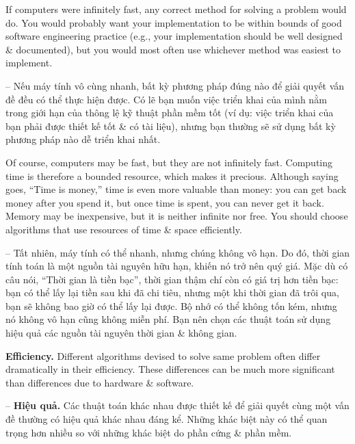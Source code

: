 \documentclass{article}
\begin{document}
\begin{itemize}
\begin{itemize}
\begin{itemize}
            If computers were infinitely fast, any correct method for solving a problem would do. You would probably want your implementation to be within bounds of good software engineering practice (e.g., your implementation should be well designed \& documented), but you would most often use whichever method was easiest to implement.
            
            -- Nếu máy tính vô cùng nhanh, bất kỳ phương pháp đúng nào để giải quyết vấn đề đều có thể thực hiện được. Có lẽ bạn muốn việc triển khai của mình nằm trong giới hạn của thông lệ kỹ thuật phần mềm tốt (ví dụ: việc triển khai của bạn phải được thiết kế tốt \& có tài liệu), nhưng bạn thường sẽ sử dụng bất kỳ phương pháp nào dễ triển khai nhất.
            
            Of course, computers may be fast, but they are not infinitely fast. Computing time is therefore a bounded resource, which makes it precious. Although saying goes, ``Time is money,'' time is even more valuable than money: you can get back money after you spend it, but once time is spent, you can never get it back. Memory may be inexpensive, but it is neither infinite nor free. You should choose algorithms that use resources of time \& space efficiently.
            
            -- Tất nhiên, máy tính có thể nhanh, nhưng chúng không vô hạn. Do đó, thời gian tính toán là một nguồn tài nguyên hữu hạn, khiến nó trở nên quý giá. Mặc dù có câu nói, ``Thời gian là tiền bạc'', thời gian thậm chí còn có giá trị hơn tiền bạc: bạn có thể lấy lại tiền sau khi đã chi tiêu, nhưng một khi thời gian đã trôi qua, bạn sẽ không bao giờ có thể lấy lại được. Bộ nhớ có thể không tốn kém, nhưng nó không vô hạn cũng không miễn phí. Bạn nên chọn các thuật toán sử dụng hiệu quả các nguồn tài nguyên thời gian \& không gian.
            
            {\bf Efficiency.} Different algorithms devised to solve same problem often differ dramatically in their efficiency. These differences can be much more significant than differences due to hardware \& software.
            
            -- {\bf Hiệu quả.} Các thuật toán khác nhau được thiết kế để giải quyết cùng một vấn đề thường có hiệu quả khác nhau đáng kể. Những khác biệt này có thể quan trọng hơn nhiều so với những khác biệt do phần cứng \& phần mềm.
            

\end{itemize}
\end{itemize}
\end{itemize}
\end{document}
